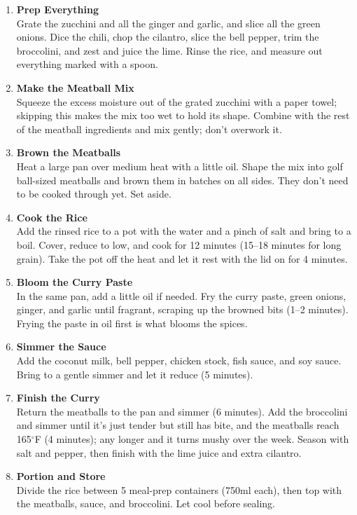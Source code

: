\begin{enumerate}

      \item \textbf{Prep Everything} \\
            Grate the zucchini and all the ginger and garlic, and slice all the green onions. Dice the chili, chop the cilantro, slice the bell pepper, trim the broccolini, and zest and juice the lime. Rinse the rice, and measure out everything marked with a spoon.

      \item \textbf{Make the Meatball Mix} \\
            Squeeze the excess moisture out of the grated zucchini with a paper towel; skipping this makes the mix too wet to hold its shape. Combine with the rest of the meatball ingredients and mix gently; don't overwork it.

      \item \textbf{Brown the Meatballs} \\
            Heat a large pan over medium heat with a little oil. Shape the mix into golf ball-sized meatballs and brown them in batches on all sides. They don't need to be cooked through yet. Set aside.

      \item \textbf{Cook the Rice} \\
            Add the rinsed rice to a pot with the water and a pinch of salt and bring to a boil. Cover, reduce to low, and cook for 12 minutes (15--18 minutes for long grain). Take the pot off the heat and let it rest with the lid on for 4 minutes.

      \item \textbf{Bloom the Curry Paste} \\
            In the same pan, add a little oil if needed. Fry the curry paste, green onions, ginger, and garlic until fragrant, scraping up the browned bits (1--2 minutes). Frying the paste in oil first is what blooms the spices.

      \item \textbf{Simmer the Sauce} \\
            Add the coconut milk, bell pepper, chicken stock, fish sauce, and soy sauce. Bring to a gentle simmer and let it reduce (5 minutes).

      \item \textbf{Finish the Curry} \\
            Return the meatballs to the pan and simmer (6 minutes). Add the broccolini and simmer until it's just tender but still has bite, and the meatballs reach 165$^\circ$F (4 minutes); any longer and it turns mushy over the week. Season with salt and pepper, then finish with the lime juice and extra cilantro.

      \item \textbf{Portion and Store} \\
            Divide the rice between 5 meal-prep containers (750ml each), then top with the meatballs, sauce, and broccolini. Let cool before sealing.

\end{enumerate}



